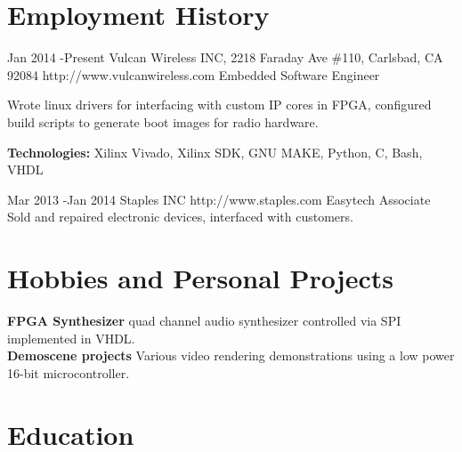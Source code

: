 \documentclass[10pt]{article} %
\begin{document}
\section{Employment History}

\job
{Jan 2014 -}{Present}
{Vulcan Wireless INC, 2218 Faraday Ave \#110, Carlsbad, CA 92084}
{http://www.vulcanwireless.com}
{Embedded Software Engineer}
{Wrote linux drivers for interfacing with custom IP cores in FPGA, configured build scripts to generate boot images for radio hardware.\\
\rule{0mm}{5mm}\textbf{Technologies:} Xilinx Vivado, Xilinx SDK, GNU MAKE, Python, C, Bash, VHDL}


\job
{Mar 2013 -}{Jan 2014}
{Staples INC}
{http://www.staples.com}
{Easytech Associate}
{Sold and repaired electronic devices, interfaced with customers.}


\section {Hobbies and Personal Projects}

\textbf{FPGA Synthesizer} quad channel audio synthesizer controlled via SPI implemented in VHDL.\\
\smallskip
\textbf{Demoscene projects} Various video rendering demonstrations using a low power 16-bit microcontroller.


\section{Education}





\end{document}
